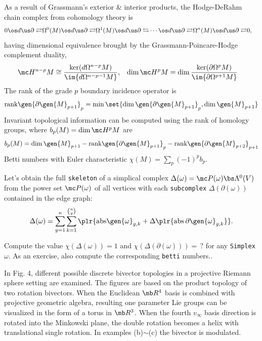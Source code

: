 \documentclass{juliacon}
\begin{document}
As a result of Grassmann's exterior \& interior products, the Hodge-DeRahm chain complex from cohomology theory is
\begin{align*}
	0 &\os d{\us\partial\rightleftarrows} \Omega^0(M) \os d{\us\partial\rightleftarrows} \Omega^1(M) \os d{\us\partial\leftrightarrows} \cdots \os d{\us\partial\rightleftarrows} \Omega^n(M) \os d{\us\partial\rightleftarrows} 0,
\end{align*}
having dimensional equivalence brought by the Grassmann-Poincare-Hodge complement duality,
\begin{align*}
	\mc H^{n-p}M &\cong \frac{\ker(d\Omega^{n-p}M)}{\im{d\Omega^{n-p-1}M}}, & \dim\mc H^pM &= \dim\frac{\ker(\partial\Omega^pM)}{\im{\partial\Omega^{p+1}M}}
\end{align*}
The rank of the grade $p$ boundary incidence operator is
$$ \text{rank}\gen{\partial\gen{M}_{p+1}}_p = \min\set{\dim\gen{\partial\gen{M}_{p+1}}_p,\dim\gen{M}_{p+1}} $$
Invariant topological information can be computed using the rank of homology groups, where $b_p(M)=\dim\mc H^pM$ are
$$ b_p(M) = \dim\gen{M}_{p+1} - \text{rank}\gen{\partial\gen{M}_{p+1}}_p - \text{rank}\gen{\partial\gen{M}_{p+2}}_{p+1} $$
Betti numbers with Euler characteristic $\chi(M) = \sum_p (-1)^pb_p$.

Let's obtain the full \verb`skeleton` of a simplical complex $\Delta(\omega)=\mc P(\omega)\bs\Lambda^0(V)$ from the power set $\mc P(\omega)$ of all vertices with each \verb`subcomplex` $\Delta(\partial(\omega))$ contained in the edge graph:
$$ \Delta(\omega) =  \sum_{g=1}^n\sum_{k=1}^{n\choose g}\plr{\text{abs}\gen{\omega}_{g,k} + \Delta\plr{\text{abs}\,\partial\gen{\omega}_{g,k}}}. $$
\begin{example}
	[Topology] Compute the value $\chi(\Delta(\omega))=1$ and $\chi(\Delta(\partial(\omega))) = \, ?$ for any \verb`Simplex` $\omega$. As an exercise, also compute the corresponding \verb`betti` numbers..
\end{example}

In Fig. 4, different possible discrete bivector topologies in a projective Riemann sphere setting are examined. 
The figures are based on the product topology of two rotation bivectors.
When the Euclidean $\mb R^4$ basis is combined with projective geometric algebra, resulting one parameter Lie groups can be visualized in the form of a torus in $\mb R^3$. 
When the fourth $v_\infty$ basis direction is rotated into the Minkowski plane, the double rotation becomes a helix with translational single rotation. In examples (b)$\sim$(c) the bivector is modulated.
\end{document}
